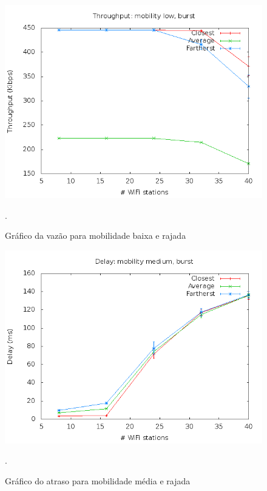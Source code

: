 \documentclass[12pt,twoside,a4paper]{article}
\begin{document}
\begin{figure}[H]
\centering
\includegraphics[scale=0.5]{mo818-throughput-mob-0-traf-1}
\caption{Gráfico da vazão para mobilidade baixa e rajada}.
\label{fig:vazao-m0-t1}
\end{figure}

\begin{figure}[H]
\centering
\includegraphics[scale=0.5]{mo818-delay-mob-1-traf-1}
\caption{Gráfico do atraso para mobilidade média e rajada}.
\label{fig:atraso-m1-t1}
\end{figure}
\end{document}
